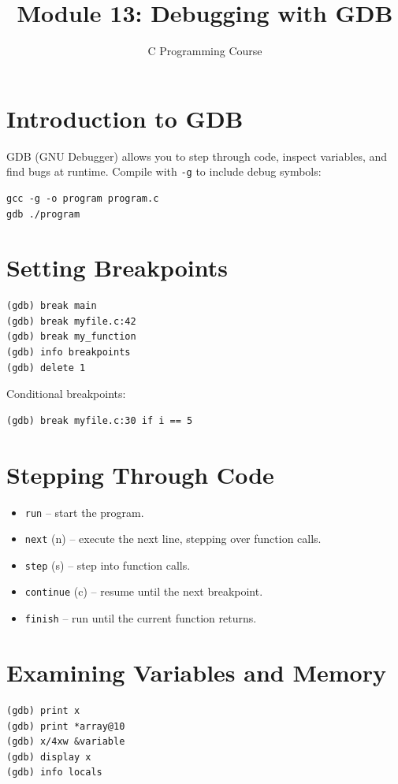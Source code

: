 \documentclass[11pt,a4paper]{article}
\title{Module 13: Debugging with GDB}
\author{C Programming Course}
\date{}
\begin{document}
\maketitle
\thispagestyle{fancy}

\section{Introduction to GDB}
GDB (GNU Debugger) allows you to step through code, inspect variables, and find
bugs at runtime. Compile with \texttt{-g} to include debug symbols:
\begin{verbatim}
gcc -g -o program program.c
gdb ./program
\end{verbatim}

\section{Setting Breakpoints}
\begin{verbatim}
(gdb) break main
(gdb) break myfile.c:42
(gdb) break my_function
(gdb) info breakpoints
(gdb) delete 1
\end{verbatim}

Conditional breakpoints:
\begin{verbatim}
(gdb) break myfile.c:30 if i == 5
\end{verbatim}

\section{Stepping Through Code}
\begin{itemize}
  \item \texttt{run} -- start the program.
  \item \texttt{next} (n) -- execute the next line, stepping over function calls.
  \item \texttt{step} (s) -- step into function calls.
  \item \texttt{continue} (c) -- resume until the next breakpoint.
  \item \texttt{finish} -- run until the current function returns.
\end{itemize}

\section{Examining Variables and Memory}
\begin{verbatim}
(gdb) print x
(gdb) print *array@10
(gdb) x/4xw &variable
(gdb) display x
(gdb) info locals
\end{verbatim}
\end{document}
